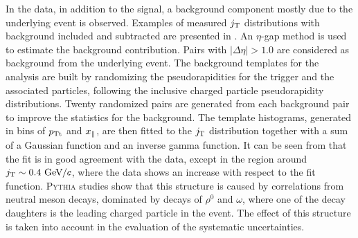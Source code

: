 In the data, in addition to the signal, a background component mostly due to the underlying event is observed. Examples of measured $j_{\rm T}$ distributions with background included and subtracted are presented in . An $\eta$-gap method is used to estimate the background contribution. Pairs with $|\Delta\eta| > 1.0$ are considered as background from the underlying event. The background templates for the analysis are built by randomizing the pseudorapidities for the trigger and the associated particles, following the inclusive charged particle pseudorapidity distributions. Twenty randomized pairs are generated from each background pair to improve the statistics for the background. The template histograms, generated in bins of $p_{\rm Tt}$ and $x_{\parallel}$, are then fitted to the $j_{\rm T}$ distribution together with a sum of a Gaussian function and an inverse gamma function. It can be seen from  that the fit is in good agreement with the data, except in the region around $j_{\rm T} \sim 0.4~\mathrm{GeV}\kern-0.05em/\kern-0.02em c$, where the data shows an increase with respect to the fit function. \textsc{Pythia} studies show that this structure is caused by correlations from neutral meson decays, dominated by decays of $\rho^{0}$ and $\omega$, where one of the decay daughters is the leading charged particle in the event. The effect of this structure is taken into account in the evaluation of the systematic uncertainties.

